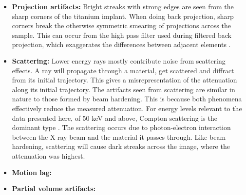 \begin{itemize}
  \item \textbf{Projection artifacts:} Bright streaks with strong edges are
	seen from the sharp corners of the titanium implant. When doing back
	projection, sharp corners break the otherwise symmetric
	smearing of projections across the sample.  This can occur from
	the high pass filter used during filtered back projection,
	which exaggerates the differences between adjacent elements
	\citep{ctnoise}.

  \item \textbf{Scattering:} Lower energy rays mostly contribute noise
      from scattering effects. A ray will propagate through a material, get
      scattered and diffract from its initial trajectory. This gives a
      misrepresentation of the attenuation along its initial trajectory. The
      artifacts seen from scattering are similar in nature to those formed by
      beam hardening. This is because both phenomena effectively reduce the
      measured attenuation. For energy levels relevant to the data presented
      here, of 50 keV and above, Compton scattering is the dominant type
      \citep{Compton}. The scattering occurs due to photon-electron interaction
      between the X-ray beam and the material it passes through. Like
      beam-hardening, scattering will cause dark streaks across the image,
      where the attenuation was highest.

      \citep{attenuation-cross-sections}


   \item \textbf{Motion lag:}
   \item \textbf{Partial volume artifacts:}
\end{itemize}


